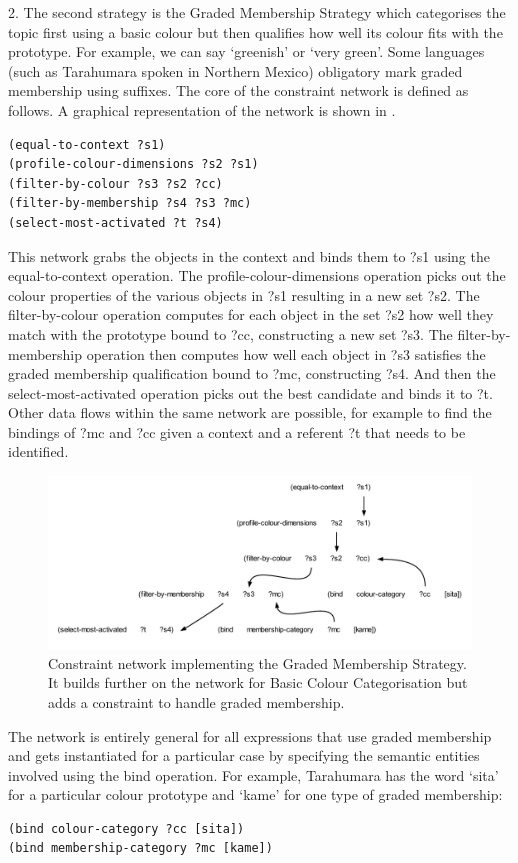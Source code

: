 2. The second strategy is the {\bfshape Graded Membership Strategy} which categorises the topic first using 
a basic colour but then qualifies how well its colour fits with the prototype. For example, we can say `greenish' or
`very green'. Some languages (such as Tarahumara spoken in Northern Mexico) obligatory mark graded membership using 
suffixes. The core of the constraint network is defined as follows. A graphical representation of the network is shown
in . 
\begin{verbatim}
(equal-to-context ?s1) 
(profile-colour-dimensions ?s2 ?s1)
(filter-by-colour ?s3 ?s2 ?cc)
(filter-by-membership ?s4 ?s3 ?mc)
(select-most-activated ?t ?s4)
\end{verbatim}
This network grabs the objects in the context and binds them to ?s1 using the equal-to-context operation. 
The profile-colour-dimensions operation picks out the colour properties of the various objects in ?s1 resulting in 
a new set ?s2. The filter-by-colour operation computes for each object in the set ?s2
how well they match with the prototype bound to ?cc, constructing a new set ?s3. The filter-by-membership operation 
then computes how well 
each object in ?s3 satisfies the graded membership qualification bound to ?mc, 
constructing ?s4. And then the select-most-activated operation picks out the best candidate and binds it to ?t. 
Other data flows within the same network are possible, for example to find the bindings of ?mc and ?cc given 
a context and a referent ?t that needs to be identified. 


\begin{figure}[htbp]
  \centerline{\includegraphics[width=1.0\textwidth]{chap11/figs/graded.pdf}}
\caption{\label{fig:graded}Constraint network implementing the Graded Membership Strategy. It builds further on the network for Basic Colour
Categorisation but adds a constraint to handle graded membership. }
\end{figure}
\enlargethispage{1\baselineskip}
The network is entirely general for all expressions that use graded membership and gets instantiated for a particular 
case by specifying the semantic entities involved using the bind operation. For example, Tarahumara has the word 
`sita' for a particular colour prototype and `kame' for one type of graded membership: 
\begin{verbatim}
(bind colour-category ?cc [sita])
(bind membership-category ?mc [kame]) 
\end{verbatim}

